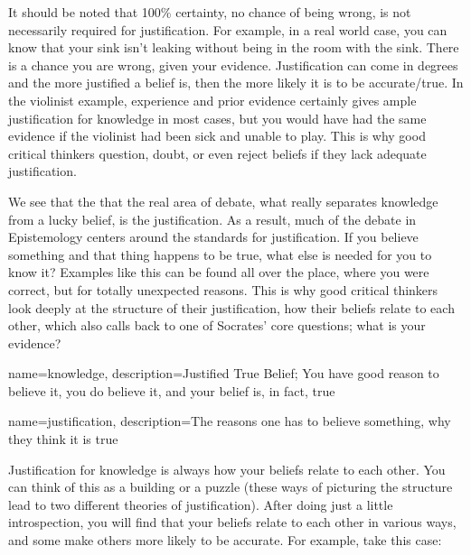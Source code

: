 It should be noted that 100\% certainty, no chance of being wrong, is not necessarily required for justification. For example, in a real world case, you can know that your sink isn't leaking without being in the room with the sink. There is a chance you are wrong, given your evidence. Justification can come in degrees and the more justified a belief is, then the more likely it is to be accurate/true. In the violinist example, experience and prior evidence certainly gives ample justification for knowledge in most cases, but you would have had the same evidence if the violinist had been sick and unable to play. This is why good critical thinkers question, doubt, or even reject beliefs if they lack adequate justification.

We see that the that the real area of debate, what really separates knowledge from a lucky belief, is the justification. As a result, much of the debate in Epistemology centers around the standards for justification. If you believe something and that thing happens to be true, what else is needed for you to know it? Examples like this can be found all over the place, where you were correct, but for totally unexpected reasons. This is why good critical thinkers look deeply at the structure of their justification, how their beliefs relate to each other, which also calls back to one of Socrates' core questions; what is your evidence?



{
name=knowledge,
description={Justified True Belief; You have good reason to believe it, you do believe it, and your belief is, in fact, true}
}


{
name=justification,
description={The reasons one has to believe something, why they think it is true}
}

Justification for knowledge is always how your beliefs relate to each other. You can think of this as a building or a puzzle (these ways of picturing the structure lead to two different theories of justification). After doing just a little introspection, you will find that your beliefs relate to each other in various ways, and some make others more likely to be accurate. For example, take this case:


